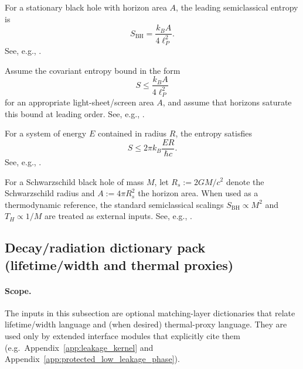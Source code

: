 \begin{assumption}
\label{ass:bh_area_law}
\MatchTag For a stationary black hole with horizon area $A$, the leading semiclassical entropy is
\[
S_{\mathrm{BH}}=\frac{k_B A}{4\ell_P^2}.
\]
See, e.g., \cite{Bekenstein1973,BardeenCarterHawking1973,Hawking1975,Wald1984,Bousso2002}.
\end{assumption}

\begin{assumption}
\label{ass:bh_covariant_entropy_bound}
\MatchTag Assume the covariant entropy bound in the form
\[
S\le \frac{k_B A}{4\ell_P^2}
\]
for an appropriate light-sheet/screen area $A$, and assume that horizons saturate this bound at leading order.
See, e.g., \cite{Bousso2002}.
\end{assumption}

\begin{assumption}
\label{ass:bh_bekenstein_bound}
\MatchTag For a system of energy $E$ contained in radius $R$, the entropy satisfies
\[
S\le 2\pi k_B \frac{E R}{\hbar c}.
\]
See, e.g., \cite{Bekenstein1981}.
\end{assumption}

\begin{assumption}
\label{ass:bh_schwarzschild_package}
\MatchTag For a Schwarzschild black hole of mass $M$, let $R_s:=2GM/c^2$ denote the Schwarzschild radius and $A:=4\pi R_s^2$ the horizon area.
When used as a thermodynamic reference, the standard semiclassical scalings
$S_{\mathrm{BH}}\propto M^2$ and $T_H\propto 1/M$
are treated as external inputs.
See, e.g., \cite{Hawking1975,Wald1984}.
\end{assumption}

\subsection{Decay/radiation dictionary pack (lifetime/width and thermal proxies)}
\label{subsec:pphys_decay_radiation_pack}

\paragraph{Scope.}
\AuditTag The inputs in this subsection are optional matching-layer dictionaries that relate lifetime/width language and (when desired) thermal-proxy language.
They are used only by extended interface modules that explicitly cite them (e.g.\ Appendix~\ref{app:leakage_kernel} and Appendix~\ref{app:protected_low_leakage_phase}).

